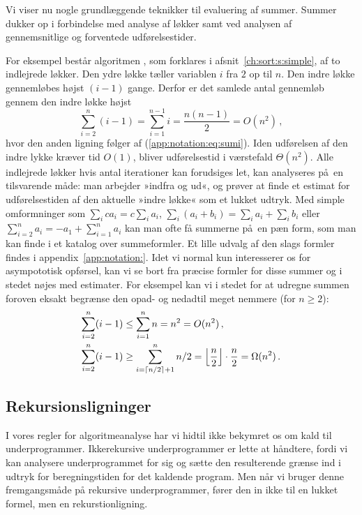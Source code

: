 %
Vi viser nu nogle grundlæggende teknikker til evaluering af summer.
Summer dukker op i forbindelse med analyse af løkker samt ved analysen af gennemsnitlige og forventede udførelsestider.

For eksempel består algoritmen ,
som forklares i afsnit~\ref{ch:sort:s:simple}, af to indlejrede løkker.
Den ydre løkke tæller variablen $i$ fra $2$ op til  $n$.
Den indre løkke gennemløbes højst $(i-1)$ gange. 
Derfor er det samlede antal gennemløb gennem den indre løkke højst
\[
\sum_{i=2}^n (i-1)
 =\sum_{i=1}^{n-1} i 
 =\frac{n(n-1)}{2} = O(n^2)\,,\]
hvor den anden ligning følger af (\ref{app:notation:eq:sumi}).
Iden udførelsen af den indre lykke kræver tid $O(1)$, bliver udførelsestid i værstefald $\Theta(n^2)$.
Alle indlejrede løkker hvis antal iterationer kan forudsiges let, kan analyseres på en tilsvarende måde:
man arbejder »indfra og ud«, og prøver at finde et estimat for udførelsestiden af den aktuelle »indre løkke« som et lukket udtryk.
Med simple omformninger som
$\sum_i ca_i=c\sum_ia_i$,
$\sum_i(a_i + b_i)=\sum_i a_i + \sum_i b_i$ eller
$\sum_{i=2}^n a_i=-a_1+\sum_{i=1}^n a_i$
kan man ofte få summerne på en pæn form, som man kan finde i et katalog over summeformler.
Et lille udvalg af den slags formler findes i appendix~\ref{app:notation:}.
Idet vi normal kun interesserer os for asympototisk opførsel, kan vi se bort fra præcise formler for disse summer og i stedet nøjes med estimater.
For eksempel kan vi i stedet for at udregne summen foroven eksakt begrænse den opad- og nedadtil meget nemmere (for $n\ge 2$):
\begin{align*}
\sum_{i=2}^n (i-1) &\leq \sum_{i=1}^n n = n^2 = O(n^2)\,,\\
\sum_{i=2}^n (i-1) &\geq \sum_{i=\lceil n/2\rceil+1}^n n/2 = \left\lfloor\frac{n}{2}\right\rfloor \cdot\frac{n}{2}=
\Omega(n^2) \,. \end{align*}

\subsection{Rekursionsligninger}

%
I vores regler for algoritmeanalyse har vi hidtil ikke bekymret os om kald til underprogrammer.
Ikkerekursive underprogrammer er lette at håndtere, fordi vi kan analysere underprogrammet for sig og sætte den resulterende grænse ind i udtryk for beregningstiden for det kaldende program.
Men når vi bruger denne fremgangsmåde på rekursive underprogrammer, fører den in ikke til en lukket formel, men en rekurstionligning.

